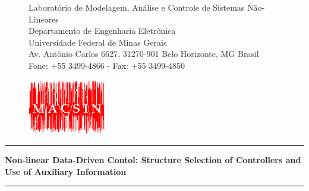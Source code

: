 
\begin{titlepage}

\begin{figure}[!ht]
\begin{minipage}[b]{0.7\linewidth}
\begin{tiny}
Laboratório de Modelagem, Análise e Controle de Sistemas Não-Lineares \\
Departamento de Engenharia Eletrônica\\
Universidade Federal de Minas Gerais\\
Av. Antônio Carlos 6627, 31270-901 Belo Horizonte, MG Brasil\\

Fone: +55 3499-4866 - Fax: +55 3499-4850 %
\end{tiny}
\end{minipage}\hfill
\begin{minipage}[c]{0.3\linewidth}
\begin{flushright}
\vspace{-1.2cm}
\includegraphics[scale=1.37]{mac.png}
\end{flushright}
\end{minipage}
\end{figure}

\vspace{1.75cm}
\begin{center}
\thickhrulefill
\par\nobreak
\vspace*{10pt}%
\hrule
\vspace*{10pt}%
{\bf \Huge \bfseries Non-linear Data-Driven Contol: Structure Selection of Controllers and Use of Auxiliary Information}
\vspace*{10pt}%
\hrule
\vspace*{40pt}%


\end{center}
\end{titlepage}
